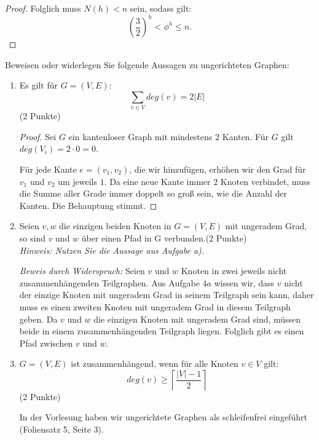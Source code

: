 \documentclass[ngerman,landscape,twocolumn]{adtexsheet}
\begin{document}
\begin{question}
\begin{enumerate}
\begin{proof}
            Folglich muss $N(h) < n$ sein, sodass gilt:
            \[
            \left(\frac{3}{2}\right)^h < \phi^h \leq n
            .\]
        \end{proof}
    \end{enumerate}
\end{question}

\begin{question}
    Beweisen oder widerlegen Sie folgende Aussagen zu ungerichteten Graphen:
    \begin{enumerate}
        \item Es gilt für $G = (V, E)$:
\[
\sum_{v \in V} deg(v) = 2|E|
\]
            (2 Punkte)
            \begin{proof}
                Sei $G$ ein kantenloser Graph mit mindestens $2$ Kanten. Für $G$ gilt $deg(V_i) = 2 \cdot 0 = 0$.
                
                Für jede Kante $e = (v_1, v_2)$, die wir hinzufügen, erhöhen wir den Grad für $v_1$ und $v_2$ um jeweils $1$.
                Da eine neue Kante immer $2$ Knoten verbindet, muss die Summe aller Grade immer doppelt so groß sein, wie die Anzahl der Kanten. Die Behauptung stimmt.
            \end{proof}
           
            
        \item Seien $v, w$ die einzigen beiden Knoten in $G = (V, E)$ mit ungeradem Grad, so sind $v$ und $w$ über einen Pfad in G verbunden.(2 Punkte) \\
            \emph{Hinweis: Nutzen Sie die Aussage aus Aufgabe a).}


            \emph{Beweis durch Widerspruch:}
            Seien $v$ und $w$ Knoten in zwei jeweils nicht zusammenhängenden Teilgraphen. Aus Aufgabe $4a$ wissen wir, dass $v$ nicht der einzige Knoten mit ungeradem Grad in seinem Teilgraph sein kann, daher muss es einen zweiten Knoten mit ungeradem Grad in diesem Teilgraph geben. Da $v$ und $w$ die einzigen Knoten mit ungeradem Grad sind, müssen beide in einem zusammenhängenden Teilgraph liegen. Folglich gibt es einen Pfad zwischen $v$ und $w$. \hfill\qedsymbol

\newpage
        \item $G = (V, E)$ ist zusammenhängend, wenn für alle Knoten $v \in V$ gilt:
\[
deg(v) \geq \left\lceil\frac{|V|-1}{2}\right\rceil
\]
            (2 Punkte)
            
            In der Vorlesung haben wir ungerichtete Graphen als schleifenfrei eingeführt (Foliensatz 5, Seite 3).
            

\end{enumerate}
\end{question}
\end{document}
